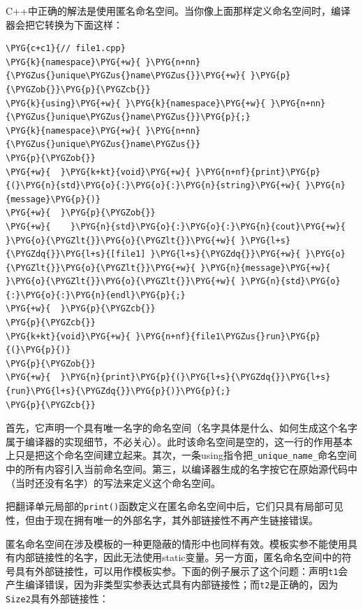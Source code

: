 
C++中正确的解法是使用匿名命名空间。当你像上面那样定义命名空间时，编译器会把它转换为下面这样：



\begin{codeblockbg}
\begin{Verbatim}[commandchars=\\\{\},breaklines=true,breakanywhere=true,fontsize=\codefont,xleftmargin=17bp]
\PYG{c+c1}{// file1.cpp}
\PYG{k}{namespace}\PYG{+w}{ }\PYG{n+nn}{\PYGZus{}unique\PYGZus{}name\PYGZus{}}\PYG{+w}{ }\PYG{p}{\PYGZob{}}\PYG{p}{\PYGZcb{}}
\PYG{k}{using}\PYG{+w}{ }\PYG{k}{namespace}\PYG{+w}{ }\PYG{n+nn}{\PYGZus{}unique\PYGZus{}name\PYGZus{}}\PYG{p}{;}
\PYG{k}{namespace}\PYG{+w}{ }\PYG{n+nn}{\PYGZus{}unique\PYGZus{}name\PYGZus{}}
\PYG{p}{\PYGZob{}}
\PYG{+w}{  }\PYG{k+kt}{void}\PYG{+w}{ }\PYG{n+nf}{print}\PYG{p}{(}\PYG{n}{std}\PYG{o}{:}\PYG{o}{:}\PYG{n}{string}\PYG{+w}{ }\PYG{n}{message}\PYG{p}{)}
\PYG{+w}{  }\PYG{p}{\PYGZob{}}
\PYG{+w}{    }\PYG{n}{std}\PYG{o}{:}\PYG{o}{:}\PYG{n}{cout}\PYG{+w}{ }\PYG{o}{\PYGZlt{}}\PYG{o}{\PYGZlt{}}\PYG{+w}{ }\PYG{l+s}{\PYGZdq{}}\PYG{l+s}{[file1] }\PYG{l+s}{\PYGZdq{}}\PYG{+w}{ }\PYG{o}{\PYGZlt{}}\PYG{o}{\PYGZlt{}}\PYG{+w}{ }\PYG{n}{message}\PYG{+w}{ }\PYG{o}{\PYGZlt{}}\PYG{o}{\PYGZlt{}}\PYG{+w}{ }\PYG{n}{std}\PYG{o}{:}\PYG{o}{:}\PYG{n}{endl}\PYG{p}{;}
\PYG{+w}{  }\PYG{p}{\PYGZcb{}}
\PYG{p}{\PYGZcb{}}
\PYG{k+kt}{void}\PYG{+w}{ }\PYG{n+nf}{file1\PYGZus{}run}\PYG{p}{(}\PYG{p}{)}
\PYG{p}{\PYGZob{}}
\PYG{+w}{  }\PYG{n}{print}\PYG{p}{(}\PYG{l+s}{\PYGZdq{}}\PYG{l+s}{run}\PYG{l+s}{\PYGZdq{}}\PYG{p}{)}\PYG{p}{;}
\PYG{p}{\PYGZcb{}}
\end{Verbatim}
\end{codeblockbg}



首先，它声明一个具有唯一名字的命名空间（名字具体是什么、如何生成这个名字属于编译器的实现细节，不必关心）。此时该命名空间是空的，这一行的作用基本上只是把这个命名空间建立起来。其次，一条using指令把\texttt{\_\allowbreak{}unique\_\allowbreak{}name\_}命名空间中的所有内容引入当前命名空间。第三，以编译器生成的名字按它在原始源代码中（当时还没有名字）的写法来定义这个命名空间。



把翻译单元局部的\texttt{print()}函数定义在匿名命名空间中后，它们只具有局部可见性，但由于现在拥有唯一的外部名字，其外部链接性不再产生链接错误。



匿名命名空间在涉及模板的一种更隐蔽的情形中也同样有效。模板实参不能使用具有内部链接性的名字，因此无法使用static变量。另一方面，匿名命名空间中的符号具有外部链接性，可以用作模板实参。下面的例子展示了这个问题：声明\texttt{t1}会产生编译错误，因为非类型实参表达式具有内部链接性；而\texttt{t2}是正确的，因为\texttt{Size2}具有外部链接性：


